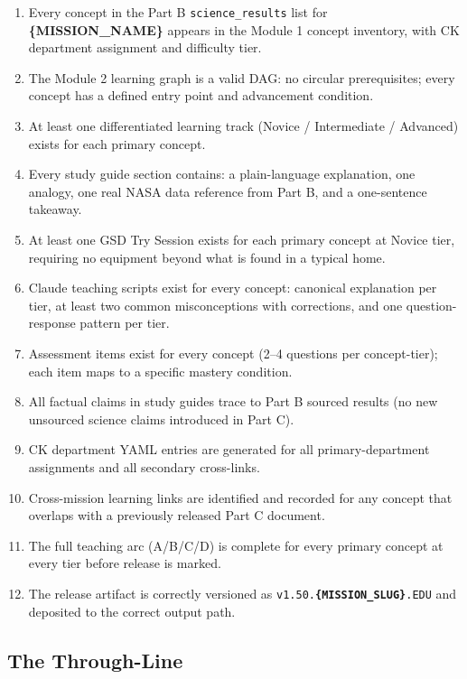 \documentclass[11pt,letterpaper]{article}
\newcommand{\param}[1]{\textcolor{paramred}{\textbf{\{#1\}}}}
\begin{document}
\begin{enumerate}[leftmargin=*, label=\textbf{SC\arabic*.}]
  \item Every concept in the Part B \texttt{science\_results} list for \param{MISSION\_NAME} appears in the Module 1 concept inventory, with CK department assignment and difficulty tier.
  \item The Module 2 learning graph is a valid DAG: no circular prerequisites; every concept has a defined entry point and advancement condition.
  \item At least one differentiated learning track (Novice / Intermediate / Advanced) exists for each primary concept.
  \item Every study guide section contains: a plain-language explanation, one analogy, one real NASA data reference from Part B, and a one-sentence takeaway.
  \item At least one GSD Try Session exists for each primary concept at Novice tier, requiring no equipment beyond what is found in a typical home.
  \item Claude teaching scripts exist for every concept: canonical explanation per tier, at least two common misconceptions with corrections, and one question-response pattern per tier.
  \item Assessment items exist for every concept (2--4 questions per concept-tier); each item maps to a specific mastery condition.
  \item All factual claims in study guides trace to Part B sourced results (no new unsourced science claims introduced in Part C).
  \item CK department YAML entries are generated for all primary-department assignments and all secondary cross-links.
  \item Cross-mission learning links are identified and recorded for any concept that overlaps with a previously released Part C document.
  \item The full teaching arc (A/B/C/D) is complete for every primary concept at every tier before release is marked.
  \item The release artifact is correctly versioned as \texttt{v1.50.\param{MISSION\_SLUG}.EDU} and deposited to the correct output path.
\end{enumerate}

\subsection{The Through-Line}
\end{document}
